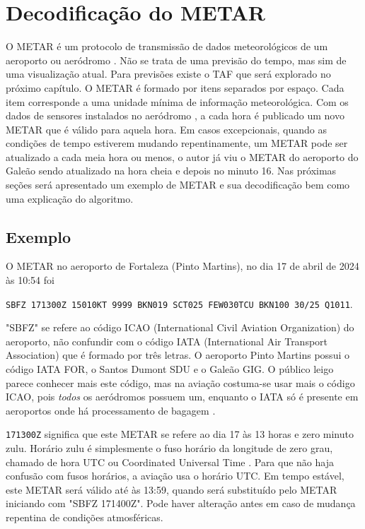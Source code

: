 \chapter{Decodificação do METAR}

O METAR é um protocolo de transmissão de dados meteorológicos de um aeroporto ou 
aeródromo \cite{metar-what}. Não se trata de uma previsão do tempo, mas sim de uma visualização atual. 
Para previsões existe o TAF que será explorado no próximo capítulo.
O METAR é formado por itens separados por espaço. Cada item corresponde a uma 
unidade mínima de informação meteorológica. Com os dados de sensores instalados 
no aeródromo \cite{metar-weather-gov}, a cada hora é publicado um novo METAR que
é válido para aquela hora. Em casos excepcionais, quando as condições de tempo 
estiverem mudando repentinamente, um METAR pode ser atualizado a cada meia hora
 \cite{METAR-speci} ou menos, o autor já viu o METAR do aeroporto do Galeão sendo atualizado
 na hora cheia e depois no minuto 16. Nas próximas seções será apresentado um 
 exemplo de METAR e sua decodificação bem como uma explicação do algoritmo.

\section{Exemplo}
O METAR no aeroporto de Fortaleza (Pinto Martins)\cite{METAR-sbfz}, no dia 17 de 
abril de 2024 às 10:54 foi

\texttt{SBFZ 171300Z 15010KT 9999 BKN019 SCT025 FEW030TCU BKN100 30/25 Q1011}.

"SBFZ" se refere ao código ICAO (International Civil Aviation Organization) do 
aeroporto, não confundir com o código IATA (International Air Transport Association) 
que é formado por três letras. O aeroporto Pinto Martins possui o código IATA FOR, 
o Santos Dumont SDU e o Galeão GIG. O público leigo parece conhecer mais este 
código, mas na aviação costuma-se usar mais o código ICAO, pois \textit{todos} os 
aeródromos possuem um, enquanto o IATA só é presente em aeroportos onde há 
processamento de bagagem \cite{iata-codes} \cite{icao-codes}.


\texttt{171300Z} significa que este METAR se refere ao dia 17 às 13 horas e zero 
minuto zulu. Horário zulu é simplesmente o fuso horário da longitude de zero grau, 
chamado de hora UTC ou Coordinated Universal Time \cite{UTC}. Para que não haja 
confusão com fusos horários, a aviação usa o horário UTC. Em tempo
estável, este 
METAR será válido até às 13:59, quando será substituído pelo METAR iniciando com 
"SBFZ 171400Z". Pode haver alteração antes em caso de mudança repentina de condições 
atmosféricas.

